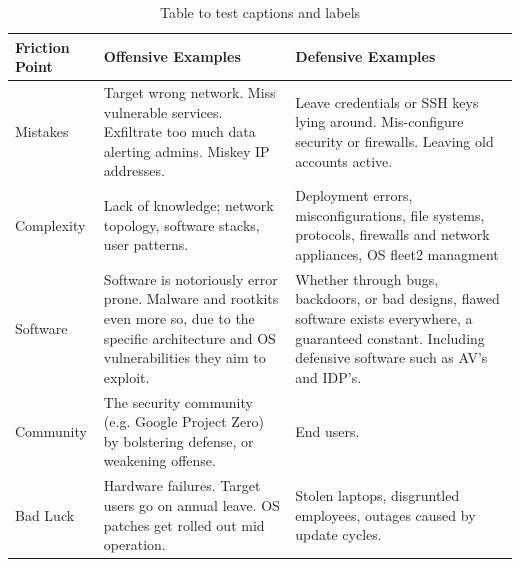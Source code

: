 \documentclass[11pt]{report}
\begin{document}
\begin{table}[!th]
	\begin{tabular}{ |p{2cm}|p{4.5cm}|p{4.5cm}| }
		\hline
		\textbf{Friction Point} & \textbf{Offensive Examples} & \textbf{Defensive Examples}                                                                                                                                                                                                                                               \\
		\hline
		Mistakes & Target wrong network. Miss vulnerable services. Exfiltrate too much data alerting admins. Miskey IP addresses. & Leave credentials or SSH keys lying around. Mis-configure security or firewalls. Leaving old accounts active.                                                                                         \\
		\hline
		Complexity & Lack of knowledge; network topology, software stacks, user patterns. & Deployment errors, misconfigurations, file systems, protocols, firewalls and network appliances, OS fleet2 managment                                                                                                                          \\
		\hline
		Software & Software is notoriously error prone. Malware and rootkits even more so, due to the specific architecture and OS vulnerabilities they aim to exploit. & Whether through bugs, backdoors, or bad designs, flawed software exists everywhere, a guaranteed constant. Including defensive software such as AV’s and IDP’s. \\
		\hline
		Community & The security community (e.g. Google Project Zero) by bolstering defense, or weakening offense. & End users.                                                                                                                                                                                                           \\
		\hline
		Bad Luck & Hardware failures. Target users go on annual leave. OS patches get rolled out mid operation. & Stolen laptops, disgruntled employees, outages caused by update cycles.                                                                                                                                                 \\
		\hline
	\end{tabular}
	\caption{Table to test captions and labels}
\end{table}
\end{document}
